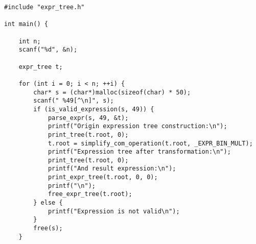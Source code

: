 \documentclass[a4paper]{article}
\newcounter{i}
\begin{document}
\begin{enumerate}[label=\textbf{\arabic*}.]
\begin{verbatim}
#include "expr_tree.h"

int main() {

    int n;
    scanf("%d", &n);

    expr_tree t;

    for (int i = 0; i < n; ++i) {
        char* s = (char*)malloc(sizeof(char) * 50);
        scanf(" %49[^\n]", s);
        if (is_valid_expression(s, 49)) {
            parse_expr(s, 49, &t);
            printf("Origin expression tree construction:\n");
            print_tree(t.root, 0);
            t.root = simplify_com_operation(t.root, _EXPR_BIN_MULT);
            printf("Expression tree after transformation:\n");
            print_tree(t.root, 0);
            printf("And result expression:\n");
            print_expr_tree(t.root, 0, 0);
            printf("\n");
            free_expr_tree(t.root);
        } else {
            printf("Expression is not valid\n");
        }
        free(s);
    }

    


\end{verbatim}
\end{enumerate}
\end{document}
